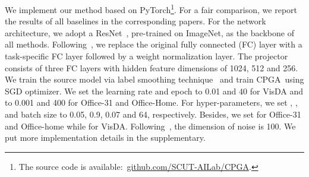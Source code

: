\documentclass{article}
\def\ournet{CPGA}
\begin{document}
We implement our method based on PyTorch\footnote{The source code is available:~\url{github.com/SCUT-AILab/CPGA}.}. For a fair comparison, we report the results of all baselines in the corresponding papers.
For the network architecture, we adopt a ResNet~\cite{He2016DeepRL}, pre-trained on ImageNet, as the backbone of all methods. Following~\cite{liang2020shot}, we replace the original fully connected (FC) layer with a task-specific FC layer followed by a weight normalization layer. 
The projector consists of three FC layers with hidden feature dimensions of 1024, 512 and 256.
We train the source model via label smoothing technique~\cite{Mller2019WhenDL} and  train \ournet~using SGD optimizer.
We set the learning rate and epoch to 0.01 and 40 for VisDA and to 0.001 and 400 for Office-31 and Office-Home.
For hyper-parameters, we set , ,  and batch size to 0.05, 0.9, 0.07 and 64, respectively. Besides, we set  for Office-31 and Office-home while  for VisDA. Following~\cite{Xu2020GenerativeLD}, the dimension of noise  is 100.
We put more implementation details in the supplementary.
\end{document}

